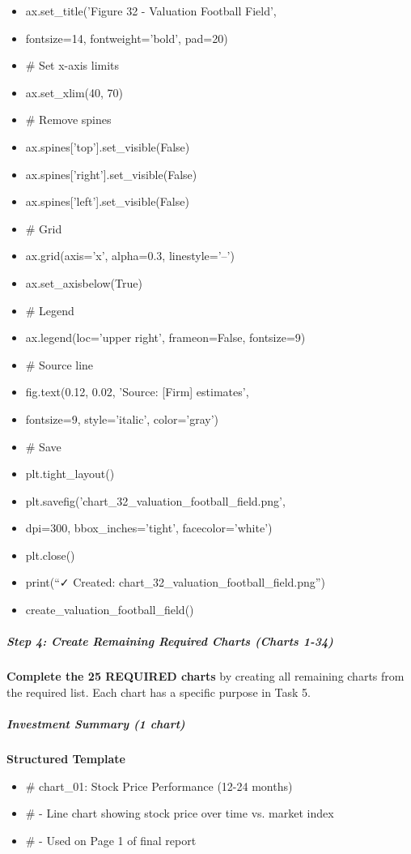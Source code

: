 \documentclass[11pt]{article}
\begin{document}
\begin{itemize}[leftmargin=*,itemsep=2pt,topsep=2pt]
\item {} ax.set\_\allowbreak{}title('Figure 32 - Valuation Football Field',
\item {} fontsize=14, fontweight='bold', pad=20)
\item {} \# Set x-axis limits
\item {} ax.set\_\allowbreak{}xlim(40, 70)
\item {} \# Remove spines
\item {} ax.spines['top'].set\_\allowbreak{}visible(False)
\item {} ax.spines['right'].set\_\allowbreak{}visible(False)
\item {} ax.spines['left'].set\_\allowbreak{}visible(False)
\item {} \# Grid
\item {} ax.grid(axis='x', alpha=0.3, linestyle='--')
\item {} ax.set\_\allowbreak{}axisbelow(True)
\item {} \# Legend
\item {} ax.legend(loc='upper right', frameon=False, fontsize=9)
\item {} \# Source line
\item {} fig.text(0.12, 0.02, 'Source: [Firm] estimates',
\item {} fontsize=9, style='italic', color='gray')
\item {} \# Save
\item {} plt.tight\_\allowbreak{}layout()
\item {} plt.savefig('chart\_\allowbreak{}32\_\allowbreak{}valuation\_\allowbreak{}football\_\allowbreak{}field.png',
\item {} dpi=300, bbox\_\allowbreak{}inches='tight', facecolor='white')
\item {} plt.close()
\item {} print(``✓ Created: chart\_\allowbreak{}32\_\allowbreak{}valuation\_\allowbreak{}football\_\allowbreak{}field.png'')
\item {} create\_\allowbreak{}valuation\_\allowbreak{}football\_\allowbreak{}field()
\end{itemize}

\subparagraph{Step 4: Create Remaining Required Charts (Charts 1-34)}\mbox{}\par

\textbf{Complete the 25 REQUIRED charts} by creating all remaining charts from the required list. Each chart has a specific purpose in Task 5.


\subparagraph{Investment Summary (1 chart)}\mbox{}\par
\textbf{Structured Template}
\begin{itemize}[leftmargin=*,itemsep=2pt,topsep=2pt]
\item {} \# chart\_\allowbreak{}01: Stock Price Performance (12-24 months)
\item {} \# - Line chart showing stock price over time vs. market index
\item {} \# - Used on Page 1 of final report
\end{itemize}
\end{document}
